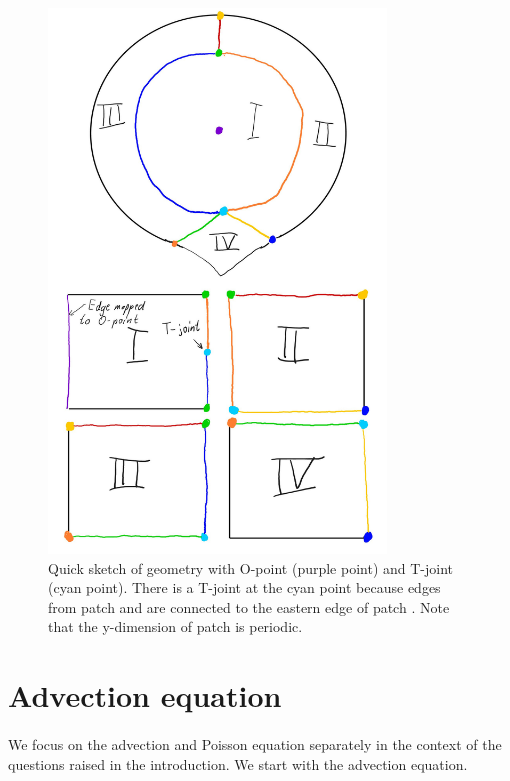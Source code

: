 \documentclass[presentation.tex]{subfiles}
\begin{document}
\begin{figure}
	\centering
	\includegraphics*[width=0.8\textwidth]{images/T-joint_sketch.jpg}
	\caption{\label{Complex_geometry_2}
			  Quick sketch of geometry with O-point (purple point) and T-joint (cyan point).
			  There is a T-joint at the cyan point because 
			  edges from patch {\uppercase\expandafter{}}
			  and {\uppercase\expandafter{}} are connected to the eastern edge
			  of patch {\uppercase\expandafter{}}. 
			  Note that the y-dimension of patch {\uppercase\expandafter{}}
			  is periodic.}
\end{figure}

\newpage


\section{Advection equation}
\paragraph{}
We focus on the advection and Poisson equation separately in the context of the questions raised in the introduction. We start with the advection equation. 
\end{document}
